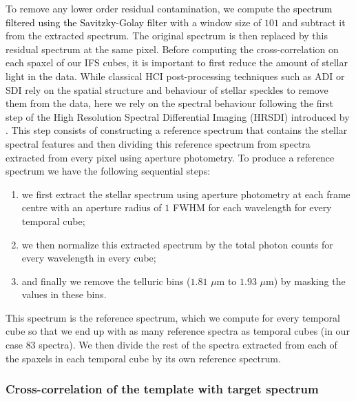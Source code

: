 \documentclass{aa}
\newcommand{\newchange}[1]{\textcolor{black}{#1}}
\begin{document}
To remove any lower order residual contamination, we compute \newchange{the spectrum filtered using the Savitzky-Golay filter \citep{1964SavitzkyGolay}} with a window size of $101$ and subtract it from the extracted spectrum. The original spectrum is then replaced by this residual spectrum at the same pixel.
Before computing the cross-correlation on each spaxel of our IFS cubes, it is important to first reduce the amount of stellar light in the data. 
While classical HCI post-processing techniques such as ADI or SDI rely on the spatial structure and behaviour of stellar speckles to remove them from the data, here we rely on the spectral behaviour following the first step of the High Resolution Spectral Differential Imaging (HRSDI) introduced by \citet{2019Haffert}. 
This step consists of constructing a reference spectrum that contains the stellar spectral features and then dividing \citep[or subtracting, in the case of][]{2019Haffert} this reference spectrum from spectra extracted from every pixel using aperture photometry. 
To produce a reference spectrum we have the following sequential steps:
\begin{enumerate}
    \item we first extract the stellar spectrum using aperture photometry at each frame centre with an aperture radius of $1$ FWHM for each wavelength for every temporal cube;
    \item we then normalize this extracted spectrum by the total photon counts for every wavelength in every cube;
    \item and finally we remove the telluric bins ($1.81$ $\mu$m to $1.93$ $\mu$m) by masking the values in these bins.
\end{enumerate}
This spectrum is the reference spectrum, which we compute for every temporal cube so that we end up with as many reference spectra as temporal cubes (in our case $83$ spectra).
We then divide the rest of the spectra extracted from each of the spaxels in each temporal cube by its own reference spectrum.

\subsubsection{Cross-correlation of the template with target spectrum}\label{sec: CC algorithm}
\end{document}

